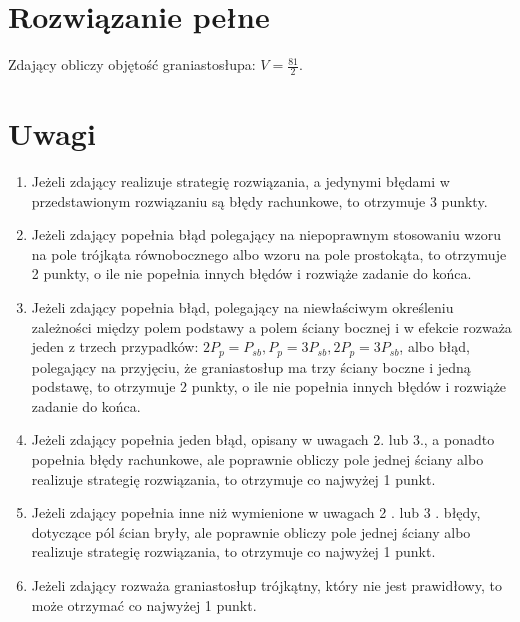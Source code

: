 \documentclass[10pt]{article}
\begin{document}
\section*{Rozwiązanie pełne}
Zdający obliczy objętość graniastosłupa: $V=\frac{81}{2}$.

\section*{Uwagi}
\begin{enumerate}
  \item Jeżeli zdający realizuje strategię rozwiązania, a jedynymi błędami w przedstawionym rozwiązaniu są błędy rachunkowe, to otrzymuje 3 punkty.
  \item Jeżeli zdający popełnia błąd polegający na niepoprawnym stosowaniu wzoru na pole trójkąta równobocznego albo wzoru na pole prostokąta, to otrzymuje 2 punkty, o ile nie popełnia innych błędów i rozwiąże zadanie do końca.
  \item Jeżeli zdający popełnia błąd, polegający na niewłaściwym określeniu zależności między polem podstawy a polem ściany bocznej i w efekcie rozważa jeden z trzech przypadków: $2 P_{p}=P_{s b}, P_{p}=3 P_{s b}, 2 P_{p}=3 P_{s b}$, albo błąd, polegający na przyjęciu, że graniastosłup ma trzy ściany boczne i jedną podstawę, to otrzymuje 2 punkty, o ile nie popełnia innych błędów i rozwiąże zadanie do końca.
  \item Jeżeli zdający popełnia jeden błąd, opisany w uwagach 2. lub 3., a ponadto popełnia błędy rachunkowe, ale poprawnie obliczy pole jednej ściany albo realizuje strategię rozwiązania, to otrzymuje co najwyżej 1 punkt.
  \item Jeżeli zdający popełnia inne niż wymienione w uwagach 2 . lub 3 . błędy, dotyczące pól ścian bryły, ale poprawnie obliczy pole jednej ściany albo realizuje strategię rozwiązania, to otrzymuje co najwyżej 1 punkt.
  \item Jeżeli zdający rozważa graniastosłup trójkątny, który nie jest prawidłowy, to może otrzymać co najwyżej 1 punkt.
\end{enumerate}
\end{document}
